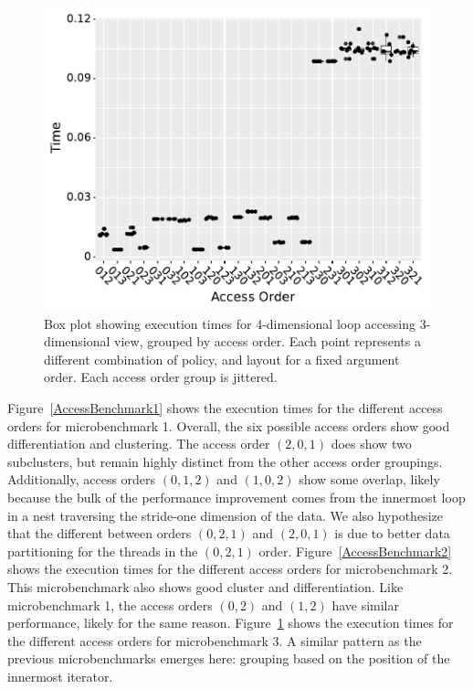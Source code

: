 \documentclass[sigconf]{acmart}
\begin{document}
\begin{figure}
	\includegraphics[width=\columnwidth]{benchmark3_boxplot.pdf}
	\caption{Box plot showing execution times for 4-dimensional loop accessing 3-dimensional view, grouped by access order. Each point represents a different combination of policy, and layout for a fixed argument order. Each access order group is jittered.}
	\label{AccessBenchmark3}
\end{figure}

Figure~\ref{AccessBenchmark1} shows the execution times for the different access orders for microbenchmark 1.
Overall, the six possible access orders show good differentiation and clustering.
The access order $(2,0,1)$ does show two subclusters, but remain highly distinct from the other access order groupings. 
Additionally, access orders $(0,1,2)$ and $(1,0,2)$ show some overlap, likely because the bulk of the performance improvement comes from the innermost loop in a nest traversing the stride-one dimension of the data.
We also hypothesize that the different between orders $(0,2,1)$ and $(2,0,1)$ is due to better data partitioning for the threads in the $(0,2,1)$ order. 
Figure~\ref{AccessBenchmark2} shows the execution times for the different access orders for microbenchmark 2. 
This microbenchmark also shows good cluster and differentiation.
Like microbenchmark 1, the access orders $(0,2)$ and $(1,2)$ have similar performance, likely for the same reason. 
Figure~\ref{AccessBenchmark3} shows the execution times for the different access orders for microbenchmark 3.
A similar pattern as the previous microbenchmarks emerges here: grouping based on the position of the innermost iterator. 
\end{document}
